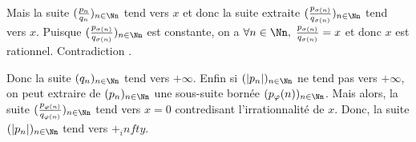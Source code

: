 {{Mais la suite $(\frac{p_n}{q_n})_{n\in\Nn}$ tend vers $x$ et donc la suite extraite $(\frac{p_{\sigma(n)}}{q_{\sigma(n)}})_{n\in\Nn}$ tend vers $x$. Puisque $(\frac{p_{\sigma(n)}}{q_{\sigma(n)}})_{n\in\Nn}$ est constante, on a $\forall n\in\Nn,\;\frac{p_{\sigma(n)}}{q_{\sigma(n)}}=x$ et donc $x$ est rationnel. Contradiction .

Donc la suite $(q_n)_{n\in\Nn}$ tend vers $+\infty$. Enfin si $(|p_n|)_{n\in\Nn}$ ne tend pas vers $+\infty$, on peut extraire de $(p_n)_{n\in\Nn}$ une sous-suite bornée $(p_{\varphi}(n))_{n\in\Nn}$. Mais alors, la suite $(\frac{p_{\varphi(n)}}{q_{\varphi(n)}})_{n\in\Nn}$ tend vers $x=0$ contredisant l'irrationnalité de $x$. Donc, la suite $(|p_n|)_{n\in\Nn}$ tend vers $+_infty$.
}
}
